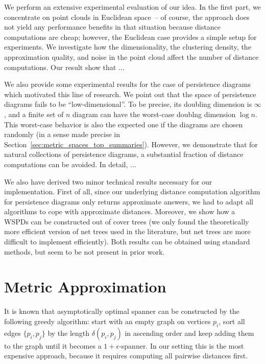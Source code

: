 \documentclass[10pt]{article}
\newcommand{\eps}{\epsilon}
\newcommand{\dist}{\delta}
\begin{document}
We perform an extensive experimental evaluation of our idea.
In the first part, we concentrate on point clouds in Euclidean space~--
of course, the approach does not yield any performance benefits in that
situation because distance computations are cheap; however, the Euclidean
case provides a simple setup for experiments.
We investigate how the dimensionality, the clustering density, 
the approximation quality, and noise 
in the point cloud affect the number of distance computations.
Our result show that $\ldots$

We also provide some experimental results for the case of persistence diagrams
which motivated this line of research. We point out that the space of
persistence diagrams fails to be ``low-dimensional''. To be precise,
its doubling dimension is $\infty$, and a finite set of $n$ diagram
can have the worst-case doublng dimension $\log n$. This worst-case
behavior is also the expected one if the diagrams are chosen randomly
(in a sense made precise in Section~\ref{sec:metric_spaces_top_summaries}). 
However, we demonstrate that
for natural collections of persistence diagrams, a substantial fraction
of distance computations can be avoided. In detail, $\ldots$

We also have derived two minor technical results necessary for 
our implementation. First of all, since our underlying distance computation
algorithm for persistence diagrams only returns approximate answers,
we had to adapt all algorithms to cope with approximate distances.
Moreover, we show how a WSPDs can be constructed
out of cover trees (we only found 
the theoretically more efficient version of
net trees used in the literature, but net trees are more difficult to implement
efficiently). Both results can be obtained using standard methods, 
but seem to be not present in prior work.


\section{Metric Approximation}

It is known that asymptotically optimal spanner can be constructed by the following greedy algorithm: 
start with an empty graph on vertices $p_i$,
sort all edges $\{p_i, p_j\}$ by the length $\dist(p_i, p_j)$ in ascending order and keep adding them to the graph
until it becomes a $1+\eps$-spanner. In our setting this is the most expensive approach, because it requires
computing all pairwise distances first.
\end{document}
